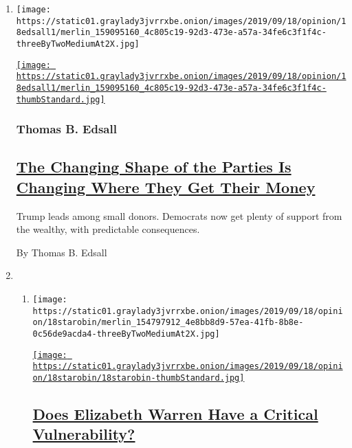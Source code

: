 \begin{enumerate}
\def\labelenumi{\arabic{enumi}.}
\item
  \texttt{[image: https://static01.graylady3jvrrxbe.onion/images/2019/09/18/opinion/18edsall1/merlin\_159095160\_4c805c19-92d3-473e-a57a-34fe6c3f1f4c-threeByTwoMediumAt2X.jpg]}

  \href{/2019/09/18/opinion/trump-fundraising-donors.html}{\texttt{[image: https://static01.graylady3jvrrxbe.onion/images/2019/09/18/opinion/18edsall1/merlin\_159095160\_4c805c19-92d3-473e-a57a-34fe6c3f1f4c-thumbStandard.jpg]}}

  \hypertarget{thomas-b-edsall}{%
  \subsubsection{Thomas B. Edsall}\label{thomas-b-edsall}}

  \hypertarget{the-changing-shape-of-the-parties-is-changing-where-they-get-their-money}{%
  \subsection{\texorpdfstring{\href{/2019/09/18/opinion/trump-fundraising-donors.html}{The
  Changing Shape of the Parties Is Changing Where They Get Their
  Money}}{The Changing Shape of the Parties Is Changing Where They Get Their Money}}\label{the-changing-shape-of-the-parties-is-changing-where-they-get-their-money}}

  Trump leads among small donors. Democrats now get plenty of support
  from the wealthy, with predictable consequences.

  By Thomas B. Edsall
\item
  \begin{enumerate}
  \def\labelenumii{\arabic{enumii}.}
  \item
    \texttt{[image: https://static01.graylady3jvrrxbe.onion/images/2019/09/18/opinion/18starobin/merlin\_154797912\_4e8bb8d9-57ea-41fb-8b8e-0c56de9acda4-threeByTwoMediumAt2X.jpg]}

    \href{/2019/09/18/opinion/elizabeth-warren-massachusetts.html}{\texttt{[image: https://static01.graylady3jvrrxbe.onion/images/2019/09/18/opinion/18starobin/18starobin-thumbStandard.jpg]}}

    \hypertarget{does-elizabeth-warren-have-a-critical-vulnerability}{%
    \subsection{\texorpdfstring{\href{/2019/09/18/opinion/elizabeth-warren-massachusetts.html}{Does
    Elizabeth Warren Have a Critical
    Vulnerability?}}{Does Elizabeth Warren Have a Critical Vulnerability?}}\label{does-elizabeth-warren-have-a-critical-vulnerability}}


\end{enumerate}
\end{enumerate}
